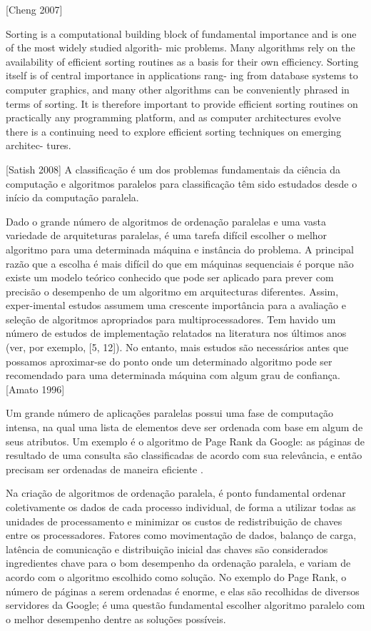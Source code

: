 [Cheng 2007]


Sorting is a computational building block of fundamental importance and is one of the most widely studied algorith- mic problems. Many algorithms rely on the availability of efficient sorting routines as a basis for their own efficiency. Sorting itself is of central importance in applications rang- ing from database systems to computer graphics, and many other algorithms can be conveniently phrased in terms of sorting. It is therefore important to provide efficient sorting routines on practically any programming platform, and as computer architectures evolve there is a continuing need to explore efficient sorting techniques on emerging architec- tures.

[Satish 2008]
A classificação é um dos problemas fundamentais da ciência da computação e algoritmos paralelos para classificação têm sido estudados desde o início da computação paralela.

Dado o grande número de algoritmos de ordenação paralelas e uma vasta variedade de arquiteturas paralelas, é uma tarefa difícil escolher o melhor algoritmo para uma determinada máquina e instância do problema. A principal razão que a escolha é mais difícil do que em máquinas sequenciais é porque não existe um modelo teórico conhecido que pode ser aplicado para prever com precisão o desempenho de um algoritmo em arquitecturas diferentes. Assim, exper-imental estudos assumem uma crescente importância para a avaliação e seleção de algoritmos apropriados para multiprocessadores. Tem havido um número de estudos de implementação relatados na literatura nos últimos anos (ver, por exemplo, [5, 12]). No entanto, mais estudos são necessários antes que possamos aproximar-se do ponto onde um determinado algoritmo pode ser recomendado para uma determinada máquina com algum grau de confiança.
[Amato 1996]


Um grande número de aplicações paralelas possui uma fase de computação intensa, na qual uma lista de elementos deve ser ordenada com base em algum de seus atributos. Um exemplo é o algoritmo de Page Rank \citep{PageRank:1999} da Google: as páginas de resultado de uma consulta são classificadas de acordo com sua relevância, e então precisam ser ordenadas de maneira eficiente \citep{Kale:2010}.



Na criação de algoritmos de ordenação paralela, é ponto fundamental ordenar coletivamente os dados de cada processo individual, de forma a utilizar todas as unidades de processamento e minimizar os custos de redistribuição de chaves entre os processadores. Fatores como movimentação de dados, balanço de carga, latência de comunicação e distribuição inicial das chaves são considerados ingredientes chave para o bom desempenho da ordenação paralela, e variam de acordo com o algoritmo escolhido como solução\citep{Kale:2010}. 
No exemplo do Page Rank, o número de páginas a serem ordenadas é enorme, e elas são recolhidas de diversos servidores da Google; é uma questão fundamental escolher algoritmo paralelo com o melhor desempenho dentre as soluções possíveis.


